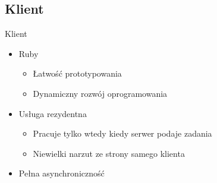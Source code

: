 \documentclass[12pt]{beamer}
\begin{document}
\subsection{Klient}
\begin{frame}{Klient}
\begin{itemize}
	\item Ruby
	\begin{itemize}
		\item Łatwość prototypowania
		\item Dynamiczny rozwój oprogramowania
	\end{itemize}
	\item Usługa rezydentna
	\begin{itemize}
		\item Pracuje tylko wtedy kiedy serwer podaje zadania
		\item Niewielki narzut ze strony samego klienta
	\end{itemize}
	\item Pełna asynchroniczność
\end{itemize}
\end{frame}
\end{document}
